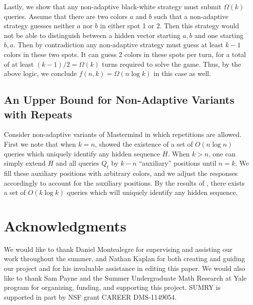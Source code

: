 \documentclass[12pt, a4paper]{article}
\begin{document}
Lastly, we show that any non-adaptive black-white strategy must submit $\Omega(k)$ queries. Assume that there are two colors $a$ and $b$ such that a non-adaptive strategy guesses neither $a$ nor $b$ in either spot 1 or 2. Then this strategy would not be able to distinguish between a hidden vector starting $a,b$ and one starting $b,a$. Then by contradiction any non-adaptive strategy must guess at least $k-1$ colors in these two spots. It can guess 2 colors in these spots per turn, for a total of at least $(k-1)/2 = \Omega(k)$ turns required to solve the game. Thus, by the above logic, we conclude $f(n,k) = \Omega(n \log k)$ in this case as well.

\subsection{An Upper Bound for Non-Adaptive Variants with Repeats}
Consider non-adaptive variants of Mastermind in which repetitions are allowed. First we note that when $k=n$, \cite{DS13} showed the existence of a set of $O(n \log n)$ queries which uniquely identify any hidden sequence $H$. When $k > n$, one can simply extend $H$ and all queries $Q_t$ by $k - n$ ``auxiliary'' positions until $n = k$. We fill these auxiliary positions with arbitrary colors, and we adjust the responses accordingly to account for the auxiliary positions. By the results of \cite{DS13}, there exists a set of $O(k \log k)$ queries which will uniquely identify any hidden sequence.

\section{Acknowledgments}
We would like to thank Daniel Montealegre for supervising and assisting our work throughout the summer, and Nathan Kaplan for both creating and guiding our project and for his invaluable assistance in editing this paper. 
 We would also like to thank Sam Payne and the Summer Undergraduate Math Research at Yale program for organizing, funding, and supporting this project. SUMRY is supported in part by NSF grant CAREER DMS-1149054.
\clearpage


\end{document}
